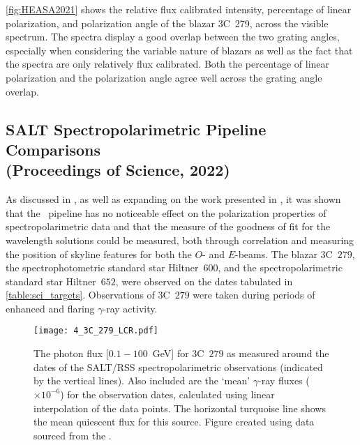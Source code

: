 \autoref{fig:HEASA2021} shows the relative flux calibrated intensity, percentage of linear polarization, and polarization angle of the blazar 3C~279, across the visible spectrum.
The spectra display a good overlap between the two grating angles, especially when considering the variable nature of blazars as well as the fact that the spectra are only relatively flux calibrated.
Both the percentage of linear polarization and the polarization angle agree well across the grating angle overlap.

\subsection[Proceeding, HEASA (2022)]{%
    \gls{SALT} Spectropolarimetric Pipeline Comparisons\\
    (Proceedings of Science,  2022)
}

As discussed in \citet[][see also \autoref{app:papers}]{Cooper_HEASA2022}, as well as expanding on the work presented in \cite{Cooper_HEASA2021}, it was shown that the \stops\ pipeline has no noticeable effect on the polarization properties of spectropolarimetric data and that the measure of the goodness of fit for the wavelength solutions could be measured, both through correlation and measuring the position of skyline features for both the $O$- and $E$-beams.
The blazar 3C~$279$, the spectrophotometric standard star Hiltner~$600$, and the spectropolarimetric standard star Hiltner~$652$, were observed on the dates tabulated in \autoref{table:sci_targets}.
Observations of 3C~$279$ were taken during periods of enhanced and flaring $\gamma$-ray activity.

\begin{figure}[t]
    \centering
    \texttt{[image: 4\_3C\_279\_LCR.pdf]}
    \caption{The  photon flux [$0.1 - 100$~GeV] for 3C~$279$ as measured around the dates of the \gls{SALT}/\gls{RSS} spectropolarimetric observations (indicated by the vertical lines). Also included are the `mean' $\gamma$-ray fluxes ($\times 10^{-6}$) for the observation dates, calculated using linear interpolation of the  data points. The horizontal turquoise line shows the mean quiescent flux for this source. Figure created using data sourced from the .\protect\footnotemark}
    \label{fig:3C_279_LCR}
\end{figure}

